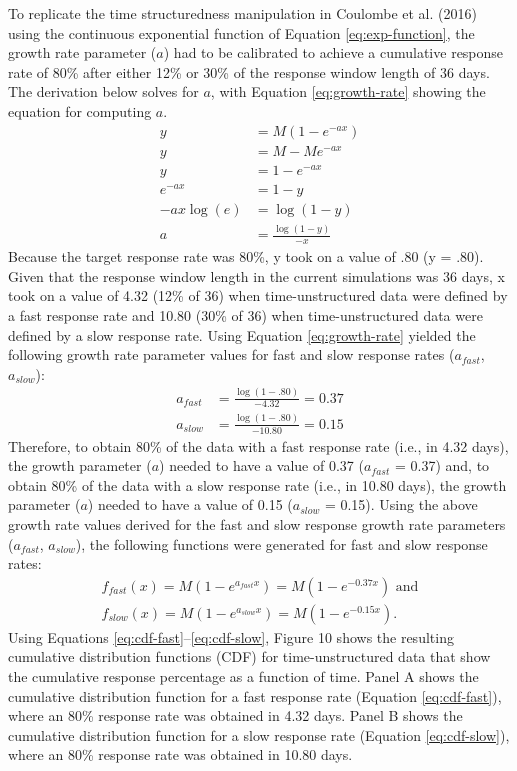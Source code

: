 \documentclass[
12pt, %
twoside,
english]{guelphthesis}
\theoremstyle{definition}
\theoremstyle{definition}
\theoremstyle{definition}
\theoremstyle{definition}
\theoremstyle{remark}
\begin{document}
To replicate the time structuredness manipulation in Coulombe et al. (2016) using the continuous exponential function of Equation \ref{eq:exp-function}, the growth rate parameter (\(a\)) had to be calibrated to achieve a cumulative response rate of 80\% after either 12\% or 30\% of the response window length of 36 days. The derivation below solves for \(a\), with Equation \ref{eq:growth-rate} showing the equation for computing \(a\).
\begin{align}
y  &= M(1 - e^{-ax}) \nonumber \\
y &= M - Me^{-ax} \nonumber \\
y &= 1 -e^{-ax} \nonumber \\
e^{-ax} &= 1-y \nonumber \\
-ax\log(e) &= \log(1 - y) \nonumber \\
a &= \frac{\log(1 - y)}{-x}
\label{eq:growth-rate}
\end{align}
\noindent Because the target response rate was 80\%, y took on a value of .80 (y = .80). Given that the response window length in the current simulations was 36 days, x took on a value of 4.32 (12\% of 36) when time-unstructured data were defined by a fast response rate and 10.80 (30\% of 36) when time-unstructured data were defined by a slow response rate. Using Equation \ref{eq:growth-rate} yielded the following growth rate parameter values for fast and slow response rates (\(a_{fast}\), \(a_{slow}\)):
\begin{align}
a_{fast} &= \frac{\log(1 - .80)}{-4.32} = 0.37 \nonumber \\
a_{slow} &= \frac{\log(1 - .80)}{-10.80} = 0.15 \nonumber
\end{align}
\noindent Therefore, to obtain 80\% of the data with a fast response rate (i.e., in 4.32 days), the growth parameter (\(a\)) needed to have a value of 0.37 (\(a_{fast}\) = 0.37) and, to obtain 80\% of the data with a slow response rate (i.e., in 10.80 days), the growth parameter (\(a\)) needed to have a value of 0.15 (\(a_{slow}\) = 0.15). Using the above growth rate values derived for the fast and slow response growth rate parameters (\(a_{fast}\), \(a_{slow}\)), the following functions were generated for fast and slow response rates:
\begin{align}
f_{fast}(x) = M(1 - e^{a_{fast}x}) = M(1 - e^{-0.37x}) \text{ and} \label{eq:cdf-fast}\\
f_{slow}(x) = M(1 - e^{a_{slow}x}) = M(1 - e^{-0.15x}).\label{eq:cdf-slow}
\end{align}
\noindent Using Equations \ref{eq:cdf-fast}--\ref{eq:cdf-slow}, Figure 10 shows the resulting cumulative distribution functions (CDF) for time-unstructured data that show the cumulative response percentage as a function of time. Panel A shows the cumulative distribution function for a fast response rate (Equation \ref{eq:cdf-fast}), where an 80\% response rate was obtained in 4.32 days. Panel B shows the cumulative distribution function for a slow response rate (Equation \ref{eq:cdf-slow}), where an 80\% response rate was obtained in 10.80 days.
\end{document}

